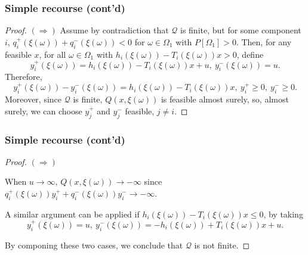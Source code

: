 \documentclass{beamer}
\begin{document}
\begin{frame}
\frametitle{Simple recourse (cont'd)}

\begin{proof}
{\bf $(\Rightarrow)$} 
Assume by contradiction that $\mathcal{Q}$ is finite, but for some component $i$, $q_i^+(\xi(\omega)) + q_i^-(\xi(\omega)) < 0$ for $\omega \in \Omega_1$ with $P[\Omega_1] > 0$.
Then, for any feasible $x$, for all $\omega \in \Omega_1$ with $h_i(\xi(\omega))-T_i(\xi(\omega))x > 0$, define
$$
y_i^+(\xi(\omega)) = h_i(\xi(\omega)) - T_i(\xi(\omega))x + u,\  y_i^-(\xi(\omega)) = u.
$$
Therefore, 
$$
y_i^+(\xi(\omega)) - y_i^-(\xi(\omega)) = h_i(\xi(\omega)) - T_i(\xi(\omega))x,\ y_i^+ \geq 0,\ y_i^- \geq 0.
$$
Moreover, since $\mathcal{Q}$ is finite, $Q(x, \xi(\omega))$ is feasible almost surely,
so, almost surely, we can choose $y_j^+$ and $y_j^-$ feasible, $j \ne i$.

\end{proof}

\end{frame}

\begin{frame}
\frametitle{Simple recourse (cont'd)}

\begin{proof}
{\bf $(\Rightarrow)$} 

When $u \rightarrow \infty$, $Q(x, \xi(\omega)) \rightarrow -\infty$ since $q_i^+(\xi(\omega))y_i^+ + q_i^-(\xi(\omega))y_i^- \rightarrow -\infty$.

\mbox{}

A similar argument can be applied if $h_i(\xi(\omega))-T_i(\xi(\omega))x \leq 0$, by taking
$$
y_i^+(\xi(\omega)) = u,\ y_i^-(\xi(\omega)) = -h_i(\xi(\omega)) + T_i(\xi(\omega))x + u.
$$

\mbox{}

By componing these two cases, we conclude that  $\mathcal{Q}$ is not finite.
\end{proof}

\end{frame}
\end{document}
